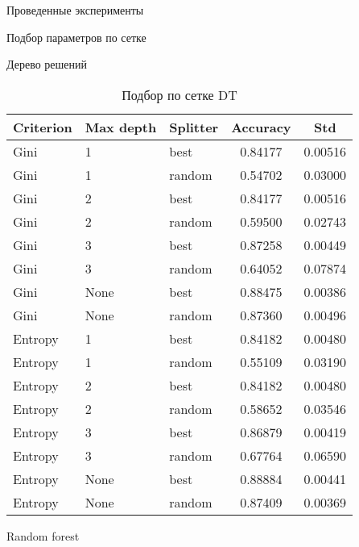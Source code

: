 \begin{section}{Проведенные эксперименты}
\begin{subsection}{Подбор параметров по сетке}
\begin{subsubsection}{Дерево решений}
\begin{table}[H]
\centering
{\begin{tabular}{|l|l|l|c|c|}
\hline
\textbf{Criterion} & \textbf{Max depth} & \textbf{Splitter} & \textbf{Accuracy} & \textbf{Std} \\
\hline
Gini & 1  & best & 0.84177 & 0.00516 \\
\hline
Gini & 1  & random &  0.54702 & 0.03000 \\
\hline
Gini & 2  & best & 0.84177 & 0.00516 \\
\hline
Gini &  2 & random  & 0.59500 & 0.02743 \\
\hline
Gini & 3  & best & 0.87258 & 0.00449 \\
\hline
Gini & 3  & random & 0.64052 & 0.07874 \\
\hline
Gini & None  & best & 0.88475 & 0.00386 \\
\hline
Gini &  None & random  & 0.87360 & 0.00496 \\
\hline
Entropy & 1  & best & 0.84182 & 0.00480 \\
\hline
Entropy & 1  & random & 0.55109 & 0.03190 \\
\hline
Entropy  & 2  & best & 0.84182 & 0.00480 \\
\hline
Entropy  &  2 & random  & 0.58652 & 0.03546 \\
\hline
Entropy  & 3  & best &  0.86879 & 0.00419 \\
\hline
Entropy  & 3  & random & 0.67764 & 0.06590 \\
\hline
Entropy & None  & best & 0.88884 & 0.00441 \\
\hline
Entropy &  None & random  & 0.87409 & 0.00369 \\
\hline
\end{tabular}}

\caption{Подбор по сетке DT}
\label{grid:dt}
\end{table}


\end{subsubsection}


\begin{subsubsection}{Random forest}


\end{subsubsection}
\end{subsection}
\end{section}
